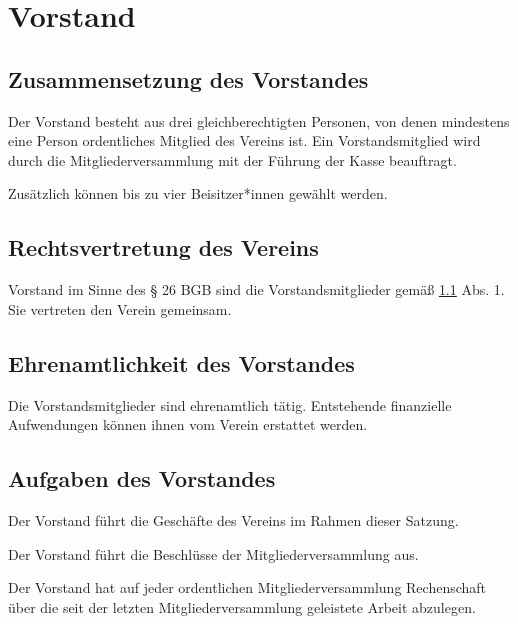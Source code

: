 \chapter{Vorstand}

\section{Zusammensetzung des Vorstandes}\label{cha:vorstand}
\begin{absätze}
    \item Der Vorstand besteht aus drei gleichberechtigten Personen, von denen mindestens eine Person ordentliches Mitglied des Vereins ist. Ein Vorstandsmitglied wird durch die Mitgliederversammlung mit der Führung der Kasse beauftragt.
    \item Zusätzlich können bis zu vier Beisitzer*innen gewählt werden.
\end{absätze}

\section{Rechtsvertretung des Vereins}
\begin{absätze}
    \item Vorstand im Sinne des § 26 BGB sind die Vorstandsmitglieder gemäß \ref{cha:vorstand} Abs. 1. Sie vertreten den Verein gemeinsam.
\end{absätze}

\section{Ehrenamtlichkeit des Vorstandes}
Die Vorstandsmitglieder sind ehrenamtlich tätig. Entstehende finanzielle Aufwendungen können ihnen vom Verein erstattet werden.
    
\section{Aufgaben des Vorstandes}
\begin{absätze}
    \item Der Vorstand führt die Geschäfte des Vereins im Rahmen dieser Satzung.
    \item Der Vorstand führt die Beschlüsse der Mitgliederversammlung aus.
    \item Der Vorstand hat auf jeder ordentlichen Mitgliederversammlung Rechenschaft über die seit der letzten Mitgliederversammlung geleistete Arbeit abzulegen.
\end{absätze}

